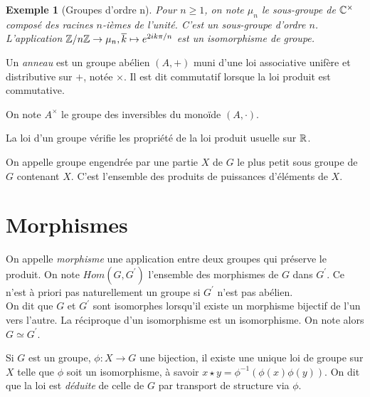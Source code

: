 \documentclass{cours}
\newtheorem{example}{Exemple}[section]
\begin{document}
\begin{example}[Groupes d'ordre n]
        Pour $n \geq 1$, on note $\mu_{n}$ le sous-groupe de $\mathbb{C}^{\times}$ composé des racines $n$-ièmes de l'unité. C'est un sous-groupe d'ordre $n$. L'application $\mathbb{Z}/n\mathbb{Z} \rightarrow \mu_{n}, \overline{k} \mapsto e^{2ik\pi/n}$ est un isomorphisme de groupe. 
\end{example}

\begin{definition}
    Un \emph{anneau} est un groupe abélien $(A, +)$ muni d'une loi associative unifère et distributive sur $+$, notée $\times$. Il est dit commutatif lorsque la loi produit est commutative.
\end{definition}

\begin{definition}
    On note $A^{\times}$ le groupe des inversibles du monoïde $(A, \cdot)$.
\end{definition}

\begin{proposition}
    La loi d'un groupe vérifie les propriété de la loi produit usuelle sur $\mathbb{R}$.
\end{proposition}

\begin{definition}
    On appelle groupe engendrée par une partie $X$ de $G$ le plus petit sous groupe de $G$ contenant $X$. C'est l'ensemble des produits de puissances d'éléments de $X$.
\end{definition}

\section{Morphismes}
\begin{definition}
    On appelle \emph{morphisme} une application entre deux groupes qui préserve le produit. On note $Hom(G, G^{'})$ l'ensemble des morphismes de $G$ dans $G^{'}$. Ce n'est à priori pas naturellement un groupe si $G^{'}$ n'est pas abélien.  \\
    On dit que $G$ et $G^{'}$ sont isomorphes lorsqu'il existe un morphisme bijectif de l'un vers l'autre. La réciproque d'un isomorphisme est un isomorphisme. On note alors $G \simeq G^{'}$.
\end{definition}

\begin{proposition}\label{transport}
    Si $G$ est un groupe, $\phi : X \rightarrow G$ une bijection, il existe une unique loi de groupe sur $X$ telle que $\phi$ soit un isomorphisme, à savoir $x \star y = \phi^{-1}(\phi(x)\phi(y))$. On dit que la loi est \emph{déduite} de celle de $G$ par transport de structure via $\phi$.
\end{proposition}
\end{document}
